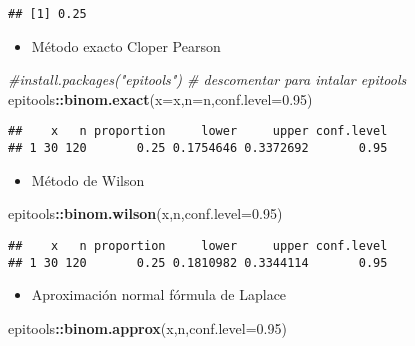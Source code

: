 \documentclass[
]{article}
\newenvironment{Shaded}{\begin{snugshade}}{\end{snugshade}}
\newcommand{\CommentTok}[1]{\textcolor[rgb]{0.56,0.35,0.01}{\textit{#1}}}
\newcommand{\DataTypeTok}[1]{\textcolor[rgb]{0.13,0.29,0.53}{#1}}
\newcommand{\FloatTok}[1]{\textcolor[rgb]{0.00,0.00,0.81}{#1}}
\newcommand{\KeywordTok}[1]{\textcolor[rgb]{0.13,0.29,0.53}{\textbf{#1}}}
\newcommand{\NormalTok}[1]{#1}
\newcommand{\OperatorTok}[1]{\textcolor[rgb]{0.81,0.36,0.00}{\textbf{#1}}}
\providecommand{\tightlist}{%
  \setlength{\itemsep}{0pt}\setlength{\parskip}{0pt}}
\begin{document}
\begin{verbatim}
## [1] 0.25
\end{verbatim}

\begin{itemize}
\tightlist
\item
  Método exacto Cloper Pearson
\end{itemize}

\begin{Shaded}
\begin{Highlighting}[]
\CommentTok{\#install.packages("epitools") \# descomentar para intalar epitools}
\NormalTok{epitools}\OperatorTok{::}\KeywordTok{binom.exact}\NormalTok{(}\DataTypeTok{x=}\NormalTok{x,}\DataTypeTok{n=}\NormalTok{n,}\DataTypeTok{conf.level=}\FloatTok{0.95}\NormalTok{)}
\end{Highlighting}
\end{Shaded}

\begin{verbatim}
##    x   n proportion     lower     upper conf.level
## 1 30 120       0.25 0.1754646 0.3372692       0.95
\end{verbatim}

\begin{itemize}
\tightlist
\item
  Método de Wilson
\end{itemize}

\begin{Shaded}
\begin{Highlighting}[]
\NormalTok{epitools}\OperatorTok{::}\KeywordTok{binom.wilson}\NormalTok{(x,n,}\DataTypeTok{conf.level=}\FloatTok{0.95}\NormalTok{)}
\end{Highlighting}
\end{Shaded}

\begin{verbatim}
##    x   n proportion     lower     upper conf.level
## 1 30 120       0.25 0.1810982 0.3344114       0.95
\end{verbatim}

\begin{itemize}
\tightlist
\item
  Aproximación normal fórmula de Laplace
\end{itemize}

\begin{Shaded}
\begin{Highlighting}[]
\NormalTok{epitools}\OperatorTok{::}\KeywordTok{binom.approx}\NormalTok{(x,n,}\DataTypeTok{conf.level=}\FloatTok{0.95}\NormalTok{)}
\end{Highlighting}
\end{Shaded}
\end{document}
